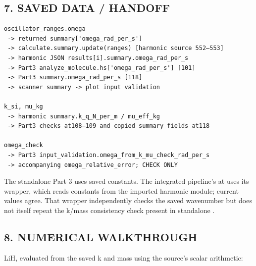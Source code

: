 \documentclass[10pt,a4paper]{article}
\begin{document}
\subsection{7. SAVED DATA / HANDOFF}
\begin{Verbatim}
oscillator_ranges.omega
 -> returned summary['omega_rad_per_s']
 -> calculate.summary.update(ranges) [harmonic source 552–553]
 -> harmonic JSON results[i].summary.omega_rad_per_s
 -> Part3 analyze_molecule.hs['omega_rad_per_s'] [101]
 -> Part3 summary.omega_rad_per_s [118]
 -> scanner summary -> plot input validation

k_si, mu_kg
 -> harmonic summary.k_q_N_per_m / mu_eff_kg
 -> Part3 checks at108–109 and copied summary fields at118

omega_check
 -> Part3 input_validation.omega_from_k_mu_check_rad_per_s
 -> accompanying omega_relative_error; CHECK ONLY
\end{Verbatim}
The standalone Part 3 uses saved constants. The integrated pipeline's  at  uses its  wrapper, which reads constants from the imported harmonic module; current values agree. That wrapper independently checks the saved wavenumber but does not itself repeat the k/mass consistency check present in standalone .

\subsection{8. NUMERICAL WALKTHROUGH}
LiH, evaluated from the saved k and mass using the source's scalar arithmetic:
\end{document}
